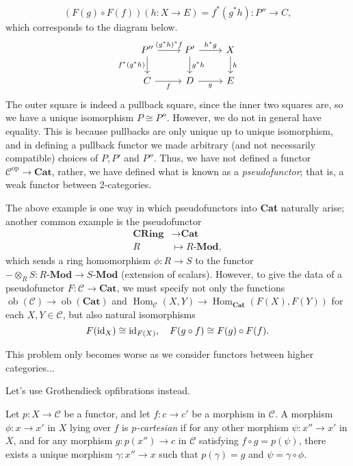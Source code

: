 \documentclass{MetricNotes2023}
\def\id{\ensuremath\text{id}}
\DeclareMathOperator{\Hom}{Hom}
\DeclareMathOperator{\ob}{ob}
\begin{document}
\[(F(g)\circ F(f))(h : X \to E)=f^*(g^*h) : P'' \to C,\] which corresponds to the diagram below.
\[\begin{tikzcd}
P'' \arrow[r, "(g^*h)^*f"] \arrow[d, swap, "f^*(g^*h)"]  & P' \arrow[r, "h^*g"] \arrow[d, "g^*h"] & X \arrow[d, "h"]  \\
C \arrow[r, swap, "f"]  & D \arrow[r, swap, "g"] & E
\end{tikzcd}\]
The outer square is indeed a pullback square, since the inner two squares are, so we have a unique isomorphism \(P \cong P''\). However, we do not in general have equality. This is because pullbacks are only unique up to unique isomorphism, and in defining a pullback functor we made arbitrary (and not necessarily compatible) choices of \(P, P'\) and \(P''\). Thus, we have not defined a functor \(\mathcal{C}^{\text{op}}\to \textbf{Cat}\), rather, we have defined what is known as a \textit{pseudofunctor}; that is, a weak functor between 2-categories. 

The above example is one way in which pseudofunctors into \textbf{Cat} naturally arise; another common example is the pseudofunctor
\begin{align*}
\textbf{CRing}&\to \textbf{Cat}\\
R\; &\mapsto R \textbf{-Mod},
\end{align*}
which sends a ring homomorphism \(\phi : R \to S\) to the functor \(-\otimes_R S : R \textbf{-Mod}\to S \textbf{-Mod}\) (extension of scalars). However, to give the data of a pseudofunctor \(F : \mathcal{C} \to \textbf{Cat}\), we must specify not only the functions \(\ob(\mathcal{C})\to \ob(\textbf{Cat})\) and \(\Hom_\mathcal{C}(X, Y)\to \Hom_\textbf{Cat}(F(X), F(Y))\) for each \(X, Y \in \mathcal{C}\), but also natural isomorphisms
\[F(\id_X) \cong \id_{F(X)}, \quad F(g \circ f) \cong F(g) \circ F(f).\]

This problem only becomes worse as we consider functors between higher categories...

Let's use Grothendieck opfibrations instead.

\begin{definition}
Let \(p : X \to \mathcal{C}\) be a functor, and let \(f : c \to c'\) be a morphism in \(\mathcal{C}\). A morphism \(\phi : x \to x'\) in \(X\) lying over \(f\) is \textit{\(p\)-cartesian} if for any other morphism \(\psi : x'' \to x'\) in \(X\), and for any morphism \(g : p(x'')\to c\) in \(\mathcal{C}\) satisfying \(f \circ g = p(\psi)\), there exists a unique morphism \(\gamma : x'' \to x\) such that \(p(\gamma)=g\) and \(\psi = \gamma \circ \phi\).  
\end{definition}
\end{document}
